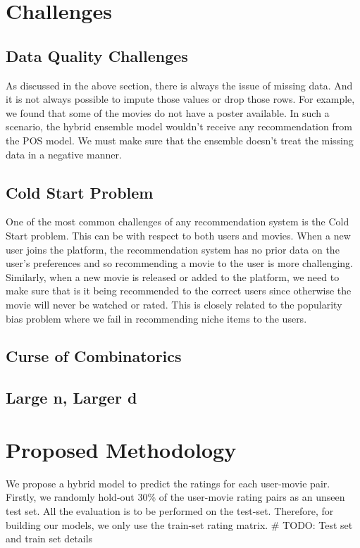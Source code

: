 \documentclass{article}
\begin{document}
\section{Challenges}
\subsection{Data Quality Challenges}
As discussed in the above section, there is always the issue of missing data. And it is not always possible to impute those values or drop those rows. For example, we found that some of the movies do not have a poster available. In such a scenario, the hybrid ensemble model wouldn't receive any recommendation from the POS model. We must make sure that the ensemble doesn't treat the missing data in a negative manner.

\subsection{Cold Start Problem}
One of the most common challenges of any recommendation system is the Cold Start problem. This can be with respect to both users and movies. When a new user joins the platform, the recommendation system has no prior data on the user's preferences and so recommending a movie to the user is more challenging. Similarly, when a new movie is released or added to the platform, we need to make sure that is it being recommended to the correct users since otherwise the movie will never be watched or rated. This is closely related to the popularity bias problem where we fail in recommending niche items to the users.

\subsection{Curse of Combinatorics}


\subsection{Large n, Larger d}

\section{Proposed Methodology}
We propose a hybrid model to predict the ratings for each user-movie pair. Firstly, we randomly hold-out 30\% of the user-movie rating pairs as an unseen test set. All the evaluation is to be performed on the test-set. Therefore, for building our models, we only use the train-set rating matrix.
# TODO: Test set and train set details
\end{document}
